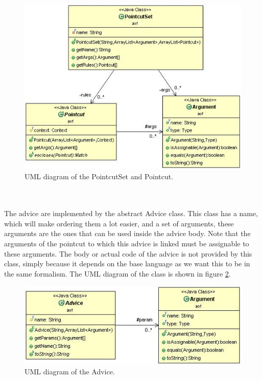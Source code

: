 \documentclass[a4paper]{report}
\begin{document}
\begin{figure}[h!]
\centering
\includegraphics[scale=0.7]{images/AOF/PointcutSet.jpg}
\caption{UML diagram of the PointcutSet and Pointcut.}
\label{fig:PointcutSet}
\end{figure}\\
\\
The advice are implemented by the abstract Advice class. This class has a name, which will make ordering them a lot easier, and a set of arguments, these arguments are the ones that can be used inside the advice body. Note that the arguments of the pointcut to which this advice is linked must be assignable to these arguments. The body or actual code of the advice is not provided by this class, simply because it depends on the base language as we want this to be in the same formalism. The UML diagram of the class is shown in figure \ref{fig:Advice}.
\begin{figure}[h!]
\centering
\includegraphics[scale=0.7]{images/AOF/Advice.jpg}
\caption{UML diagram of the Advice.}
\label{fig:Advice}
\end{figure}\\
\\
\end{document}

